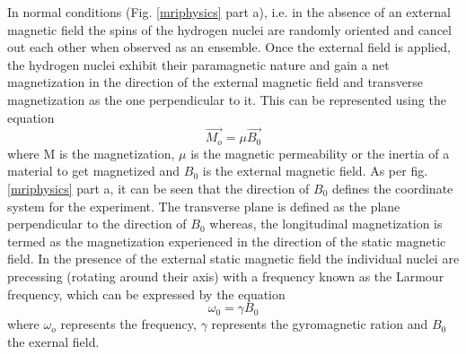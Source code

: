 \documentclass[msthesis.tex]{subfiles}
\begin{document}
In normal conditions (Fig. \ref{mriphysics} part a), i.e. in the absence of an external magnetic field the spins of the hydrogen nuclei are randomly oriented and cancel out each other when observed as an ensemble. Once the external field is applied, the hydrogen nuclei exhibit their paramagnetic nature and gain a net magnetization in the direction of the external magnetic field and transverse magnetization as the one perpendicular to it.  This can be represented using the equation
\begin{equation}
       \Vec{M_o} = \mu \Vec{B_0}
\end{equation}
where M is the magnetization, $\mu$ is the magnetic permeability or the inertia of a material to get magnetized and $B_0$ is the external magnetic field. As per fig. \ref{mriphysics} part a, it can be seen that the direction of $B_0$ defines the coordinate system for the experiment. The transverse plane is defined as the plane perpendicular to the direction of $B_0$ whereas, the longitudinal magnetization is termed as the magnetization experienced in the direction of the static magnetic field. In the presence of the external static magnetic field the individual nuclei are precessing (rotating around their axis) with a frequency known as the Larmour frequency, which can be expressed by the equation
\begin{equation}
    \omega_0 = \gamma B_0
    \label{larmour}
\end{equation}
where $\omega_o$ represents the frequency, $\gamma$ represents the gyromagnetic ration and $B_0$ the exernal field.
\end{document}
